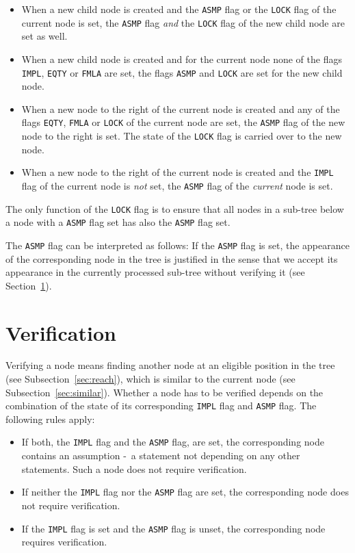 \documentclass[british]{article}
\begin{document}
\begin{itemize}
	\item
		When a new child node is created and the \texttt{ASMP} flag or the
		\texttt{LOCK} flag of the current node is set, the \texttt{ASMP} flag
		\emph{and} the \texttt{LOCK} flag of the new child node are set as well. 
	\item
		When a new child node is created and for the current node none of the
		flags \texttt{IMPL}, \texttt{EQTY} or \texttt{FMLA} are set, the flags
		\texttt{ASMP} and \texttt{LOCK} are set for the new child node.
	\item
		When a new node to the right of the current node is created and any of
		the flags \texttt{EQTY}, \texttt{FMLA} or \texttt{LOCK} of the current
		node are set, the \texttt{ASMP} flag of the new node to the right is
		set. The state of the \texttt{LOCK} flag is carried over to the new
		node.
	\item
		When a new node to the right of the current node is created and the
		\texttt{IMPL} flag of the current node is \emph{not} set, the
		\texttt{ASMP} flag of the \emph{current} node is set.
\end{itemize}

The only function of the \texttt{LOCK} flag is to ensure that all nodes in a
sub-tree below a node with a \texttt{ASMP} flag set has also the \texttt{ASMP}
flag set.\newline

The \texttt{ASMP} flag can be interpreted as follows: If the \texttt{ASMP} flag
is set, the appearance of the corresponding node in the tree is justified in the
sense that we accept its appearance in the currently processed sub-tree without
verifying it (see Section~\ref{sec:verify}).

\pagebreak{}

\section{Verification}\label{sec:verify}

Verifying a node means finding another node at an eligible position in the tree
(see Subsection~\ref{sec:reach}), which is similar to the current node (see
Subsection~\ref{sec:similar}).  Whether a node has to be verified depends on the
combination of the state of its corresponding \texttt{IMPL} flag and
\texttt{ASMP} flag. The following rules apply:

\begin{itemize}
	\item
		If both, the \texttt{IMPL} flag and the \texttt{ASMP} flag, are set, the
		corresponding node contains an assumption -\ a statement not depending
		on any other statements. Such a node does not require verification.
	\item
		If neither the \texttt{IMPL} flag nor the \texttt{ASMP} flag are set,
		the corresponding node does not require verification.
	\item
		If the \texttt{IMPL} flag is set and the \texttt{ASMP} flag is unset,
		the corresponding node requires verification.
\end{itemize}
\end{document}
